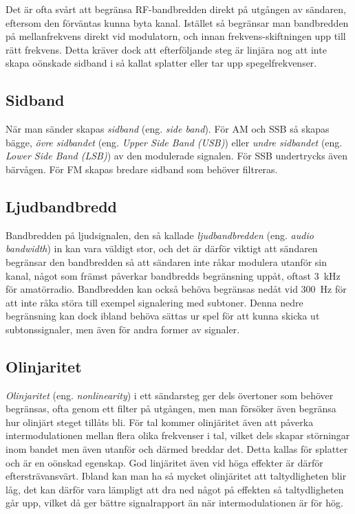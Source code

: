 Det är ofta svårt att begränsa RF-bandbredden direkt på utgången av sändaren,
eftersom den förväntas kunna byta kanal.
Istället så begränsar man bandbredden på mellanfrekvens direkt vid modulatorn,
och innan frekvens-skiftningen upp till rätt frekvens.
Detta kräver dock att efterföljande steg är linjära nog att inte skapa oönskade
sidband i så kallat splatter eller tar upp spegelfrekvenser.

\newpage
\subsection{Sidband}

När man sänder skapas \emph{sidband} (eng. \emph{side band}).
För AM och SSB så skapas bägge, \emph{övre sidbandet}
(eng. \emph{Upper Side Band (USB)}) eller \emph{undre sidbandet}
(eng. \emph{Lower Side Band (LSB)}) av den modulerade signalen.
För SSB undertrycks även bärvågen.
För FM skapas bredare sidband som behöver filtreras.

\subsection{Ljudbandbredd}

Bandbredden på ljudsignalen, den så kallade \emph{ljudbandbredden} (eng.
\emph{audio bandwidth}) in kan vara väldigt stor, och det är därför viktigt
att sändaren begränsar den bandbredden så att sändaren inte råkar modulera
utanför sin kanal, något som främst påverkar bandbredds begränsning uppåt,
oftast \qty{3}{\kilo\hertz} för amatörradio.
Bandbredden kan också behöva begränsas nedåt vid \qty{300}{\hertz} för att inte
råka störa till exempel signalering med subtoner.
Denna nedre begränsning kan dock ibland behöva sättas ur spel för att
kunna skicka ut subtonssignaler, men även för andra former av signaler.

\subsection{Olinjaritet}

\emph{Olinjaritet} (eng. \emph{nonlinearity}) i ett sändarsteg ger dels
övertoner som behöver begränsas, ofta genom ett filter på utgången, men man
försöker även begränsa hur olinjärt steget tillåts bli.
För tal kommer olinjäritet även att påverka intermodulationen mellan flera
olika frekvenser i tal, vilket dels skapar störningar inom bandet men även
utanför och därmed breddar det.
Detta kallas för splatter och är en oönskad egenskap.
God linjäritet även vid höga effekter är därför eftersträvansvärt.
Ibland kan man ha så mycket olinjäritet att taltydligheten blir låg, det
kan därför vara lämpligt att dra ned något på effekten så taltydligheten går
upp, vilket då ger bättre signalrapport än när intermodulationen är för hög.

